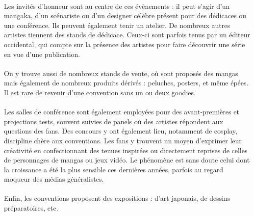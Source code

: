 \paragraph{}
Les invités d’honneur sont au centre de ces évènements : il peut s’agir d’un mangaka, d’un scénariste ou d’un designer célèbre présent pour des dédicaces ou une conférence. Ils peuvent également tenir un atelier. De nombreux autres artistes tiennent des stands de dédicace. Ceux-ci sont parfois tenus par un éditeur occidental, qui compte sur la présence des artistes pour faire découvrir une série en vue d’une publication.
\paragraph{}
On y trouve aussi de nombreux stands de vente, où sont proposés des mangas mais également de nombreux produits dérivés : peluches, posters, et même épées. Il est rare de revenir d’une convention sans un ou deux goodies.
\paragraph{}
Les salles de conférence sont également employées pour des avant-premières et projections tests, souvent suivies de panels où des artistes répondent aux questions des fans. Des concours y ont également lieu, notamment de cosplay, discipline chère aux conventions. Les fans y trouvent un moyen d’exprimer leur créativité en confectionnant des tenues inspirées ou directement reprises de celles de personnages de mangas ou jeux vidéo. Le phénomène est sans doute celui dont la croissance a été la plus sensible ces dernières années, parfois au regard moqueur des médias généralistes.
\paragraph{}
Enfin, les conventions proposent des expositions : d’art japonais, de dessins préparatoires, etc.
